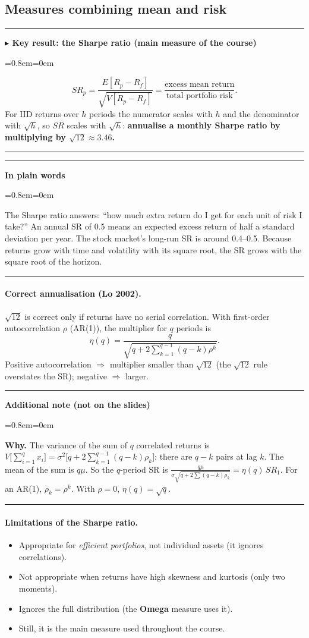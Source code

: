 \documentclass[11pt,a4paper]{report}
\newenvironment{notebox}[1]
  {\par\medskip\Needspace{6\baselineskip}\noindent\rule{\linewidth}{0.4pt}\par\nopagebreak
   \noindent\textbf{#1}\par\nopagebreak
   \begin{list}{}{\leftmargin=0.8em\rightmargin=0em\topsep=2pt}\item[]}
  {\end{list}\nopagebreak\noindent\rule{\linewidth}{0.4pt}\par\medskip}
\newenvironment{keybox}[1][]{\begin{notebox}{$\blacktriangleright$ Key result#1}}{\end{notebox}}
\newenvironment{plainbox}{\begin{notebox}{In plain words}}{\end{notebox}}
\newenvironment{addnote}{\begin{notebox}{Additional note (not on the slides)}}{\end{notebox}}
\begin{document}
\subsection{Measures combining mean and risk}

\begin{keybox}[: the Sharpe ratio (main measure of the course)]
\[
SR_p=\frac{E[R_p-R_f]}{\sqrt{V[R_p-R_f]}}=\frac{\text{excess mean return}}{\text{total portfolio risk}}.
\]
For IID returns over $h$ periods the numerator scales with $h$ and the denominator
with $\sqrt h$, so $SR$ scales with $\sqrt h$: \textbf{annualise a monthly Sharpe
ratio by multiplying by $\sqrt{12}\approx3.46$.}
\end{keybox}

\begin{plainbox}
The Sharpe ratio answers: ``how much extra return do I get for each unit of risk
I take?'' An annual SR of 0.5 means an expected excess return of half a
standard deviation per year. The stock market's long-run SR is around 0.4--0.5.
Because returns grow with time and volatility with its square root, the SR
grows with the square root of the horizon.
\end{plainbox}
\paragraph{Correct annualisation (Lo 2002).} $\sqrt{12}$ is correct only if returns
have no serial correlation. With first-order autocorrelation $\rho$ (AR(1)),
the multiplier for $q$ periods is
\[
\eta(q)=\frac{q}{\sqrt{q+2\sum_{k=1}^{q-1}(q-k)\rho^k}}.
\]
Positive autocorrelation $\Rightarrow$ multiplier smaller than $\sqrt{12}$
(the $\sqrt{12}$ rule overstates the SR); negative $\Rightarrow$ larger.

\begin{addnote}
\textbf{Why.} The variance of the sum of $q$ correlated returns is
$V\big[\sum_{i=1}^q x_i\big]=\sigma^2\big[q+2\sum_{k=1}^{q-1}(q-k)\rho_k\big]$:
there are $q-k$ pairs at lag $k$. The mean of the sum is $q\mu$. So the
$q$-period SR is $\frac{q\mu}{\sigma\sqrt{q+2\sum(q-k)\rho_k}}=\eta(q)\,SR_1$.
For an AR(1), $\rho_k=\rho^k$. With $\rho=0$, $\eta(q)=\sqrt q$.
\end{addnote}

\paragraph{Limitations of the Sharpe ratio.}
\begin{itemize}
  \item Appropriate for \emph{efficient portfolios}, not individual assets (it ignores correlations).
  \item Not appropriate when returns have high skewness and kurtosis (only two moments).
  \item Ignores the full distribution (the \textbf{Omega} measure uses it).
  \item Still, it is the main measure used throughout the course.
\end{itemize}
\end{document}
